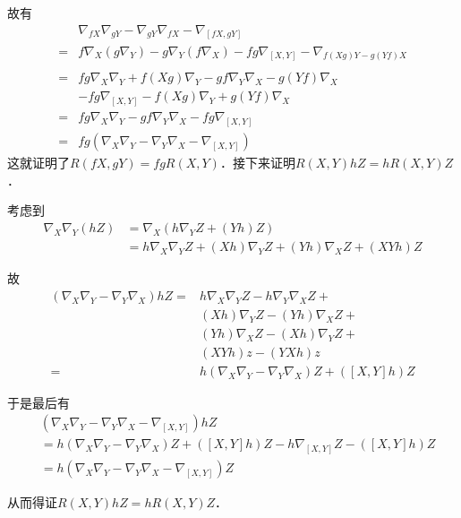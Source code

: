 故有
\begin{equation}
\begin{aligned}
&\nabla_{fX}\nabla_{gY}-\nabla_{gY}\nabla_{fX}-\nabla_{[fX, gY]}\\=&f\nabla_X(g\nabla_Y)-g\nabla_Y(f\nabla_X)-fg\nabla_{[X, Y]}-\nabla_{f(Xg)Y-g(Yf)X}\\
\\=&fg\nabla_X\nabla_Y+f(Xg)\nabla_Y-gf\nabla_Y\nabla_X-g(Yf)\nabla_X\\&-fg\nabla_{[X, Y]}-f(Xg)\nabla_Y+g(Yf)\nabla_X\\
=&fg\nabla_X\nabla_Y-gf\nabla_Y\nabla_X-fg\nabla_{[X, Y]}\\
=&fg(\nabla_X\nabla_Y-\nabla_Y\nabla_X-\nabla_{[X, Y]})
\end{aligned}
\end{equation}
这就证明了$R(fX, gY)=fgR(X, Y)$．接下来证明$R(X, Y)hZ=hR(X, Y)Z$．

考虑到
\begin{equation}
\begin{aligned}
\nabla_X\nabla_Y(hZ)&=\nabla_X(h\nabla_YZ+(Yh)Z)\\
&=h\nabla_X\nabla_YZ+(Xh)\nabla_YZ+(Yh)\nabla_XZ+(XYh)Z
\end{aligned}
\end{equation}

故
\begin{equation}
\begin{aligned}
(\nabla_X\nabla_Y-\nabla_Y\nabla_X)hZ=& h\nabla_X\nabla_YZ-h\nabla_Y\nabla_XZ+\\&(Xh)\nabla_YZ-(Yh)\nabla_XZ+\\&(Yh)\nabla_XZ-(Xh)\nabla_YZ+\\&(XYh)z-(YXh)z\\
=& h(\nabla_X\nabla_Y-\nabla_Y\nabla_X)Z+([X, Y]h)Z
\end{aligned}
\end{equation}

于是最后有
\begin{equation}
\begin{aligned}
&(\nabla_X\nabla_Y-\nabla_Y\nabla_X-\nabla_{[X, Y]})hZ\\
&=h(\nabla_X\nabla_Y-\nabla_Y\nabla_X)Z+([X, Y]h)Z-h\nabla_{[X, Y]}Z-([X, Y]h)Z\\
&=h(\nabla_X\nabla_Y-\nabla_Y\nabla_X-\nabla_{[X, Y]})Z
\end{aligned}
\end{equation}

从而得证$R(X, Y)hZ=hR(X, Y)Z$．

